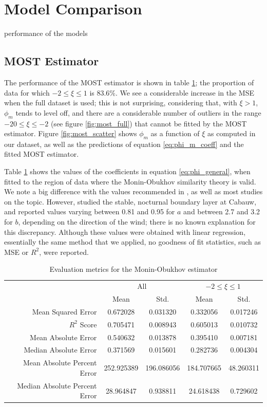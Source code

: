 \documentclass[12pt]{book}
\begin{document}
\section{Model Comparison}
performance of the models


\subsection{MOST Estimator}
\label{sec:most_estimator_results}
The performance of the MOST estimator is shown in table \ref{tbl:most_results}; the proportion of data for which $-2\leq\xi\leq 1$ is 83.6\%. We see a considerable increase in the MSE when the full dataset is used; this is not surprising, considering that, with $\xi>1$, $\phi_m$ tends to level off, and there are a considerable number of outliers in the range $-20\leq\xi\leq-2$ (see figure \ref{fig:most_full}) that cannot be fitted by the MOST estimator. Figure \ref{fig:most_scatter} shows $\phi_m$ as a function of $\xi$ as computed in our dataset, as well as the predictions of equation \ref{eq:phi_m_coeff} and the fitted MOST estimator.

Table \ref{tbl:most_results} shows the values of the coefficients in equation \ref{eq:phi_general}, when fitted to the region of data where the Monin-Obukhov similarity theory is valid. We note a big difference with the values recommended in \cite{hogstrom88}, as well as most studies on the topic. However, \cite{cabauw_night_most} studied the stable, nocturnal boundary layer at Cabauw, and reported values varying between 0.81 and 0.95 for $a$ and between 2.7 and 3.2 for $b$, depending on the direction of the wind; there is no known explanation for this discrepancy. Although these values were obtained with linear regression, essentially the same method that we applied, no goodness of fit statistics, such as MSE or $R^2$, were reported.

\begin{table}[]
\centering
\caption{Evaluation metrics for the Monin-Obukhov estimator}
\label{tbl:most_results}
\begin{tabular}{r|c|c|c|c}
& \multicolumn{2}{c|}{All} & \multicolumn{2}{c}{$-2\le\xi\le1$} \\
 & Mean & Std.  & Mean & Std. \\ \hline
Mean Squared Error 					& 0.672028  		& 0.031320  & 0.332056    & 0.017246     \\
$R^2$ Score									& 0.705471    	& 0.008943 & 0.605013    & 0.010732       \\
Mean Absolute Error 					& 0.540632  		& 0.013878 & 0.395410    & 0.007181      \\
Median Absolute Error 				& 0.371569 		& 0.015601 & 0.282736    & 0.004304      \\
Mean Absolute Percent Error  	& 252.925389 	& 196.086056 & 184.707665   & 48.260311    \\
Median Absolute Percent Error	& 28.964847  	& 0.938811 & 24.618438    & 0.729602   
\end{tabular}
\end{table}
\end{document}

